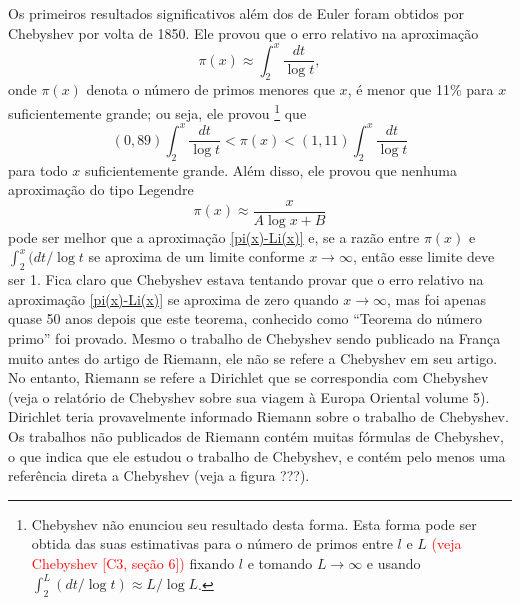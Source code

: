     Os primeiros resultados significativos além dos de Euler foram obtidos por Chebyshev por volta de 1850. Ele provou que o erro relativo na aproximação
    \begin{equation}
        \label{pi(x)-Li(x)}
        \pi(x) \approx \int_{2}^{x} \frac{dt}{\log t},
    \end{equation}
    onde $\pi(x)$ denota o número de primos menores que $x$, é menor que 11\% para $x$ suficientemente grande; ou seja, ele provou
    \footnote{
    Chebyshev não enunciou seu resultado desta forma. Esta forma pode ser obtida das suas estimativas para o número de primos entre $l$ e $L$ \textcolor{red}{(veja Chebyshev [C3, seção 6])} fixando $l$ e tomando $L \to \infty$ e usando $\int_{2}^{L}(dt/\log t) \approx L/\log L$.}
    que
    \begin{equation*}
        (0,89)\int_{2}^{x} \frac{dt}{\log t} < \pi(x) < (1,11)\int_{2}^{x} \frac{dt}{\log t}
    \end{equation*}
    para todo $x$ suficientemente grande. Além disso, ele provou que nenhuma aproximação do tipo Legendre
    $$ \pi(x) \approx \frac{x}{A\log x + B} $$
    pode ser melhor que a aproximação \eqref{pi(x)-Li(x)} e, 
    se a razão entre $\pi(x)$ e 
    $\int_{2}^{x} (dt/\log t$ se aproxima de um limite conforme $x \to \infty$, 
    então esse limite deve ser 1. Fica claro que Chebyshev estava tentando 
    provar que o erro relativo na aproximação \eqref{pi(x)-Li(x)} 
    se aproxima de zero quando $x \to \infty$, mas foi apenas 
    quase 50 anos depois que este teorema, conhecido como 
    ``Teorema do número primo'' foi provado. 
    Mesmo o trabalho de Chebyshev sendo publicado na França muito antes 
    do artigo de Riemann, ele não se refere a Chebyshev em seu artigo. 
    No entanto, Riemann se refere a Dirichlet que 
    {\red se correspondia com} Chebyshev 
    (veja o relatório de Chebyshev sobre sua viagem à Europa Oriental 
    \cite{Chebyshev47} volume 5). 
    Dirichlet teria provavelmente informado Riemann sobre o trabalho de Chebyshev. 
    Os trabalhos não publicados de Riemann contém muitas fórmulas de Chebyshev, 
    o que indica que ele estudou o trabalho de Chebyshev, 
    e contém pelo menos uma referência direta a Chebyshev {\red(veja a figura ???)}.
    
